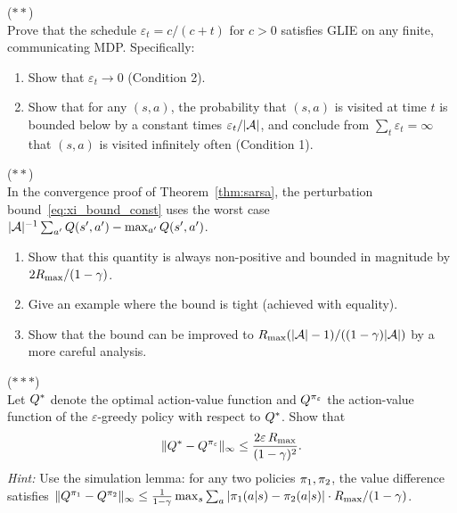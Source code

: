 \documentclass[11pt,a4paper]{article}
\begin{document}
\begin{exercise}
\textnormal{(\(**\))} \\
Prove that the schedule $\varepsilon_t = c/(c+t)$ for $c > 0$
satisfies GLIE on any finite, communicating MDP. Specifically:
\begin{enumerate}[nosep]
  \item[(a)] Show that $\varepsilon_t \to 0$ (Condition 2).
  \item[(b)] Show that for any $(s,a)$, the probability that
    $(s,a)$ is visited at time $t$ is bounded below by a constant
    times $\varepsilon_t/|\mathcal{A}|$, and conclude from
    $\sum_t \varepsilon_t = \infty$ that $(s,a)$ is visited
    infinitely often (Condition 1).
\end{enumerate}
\end{exercise}

\begin{exercise}
\textnormal{(\(**\))} \\
In the convergence proof of Theorem~\ref{thm:sarsa}, the
perturbation bound~\eqref{eq:xi_bound_const} uses the worst case
$|\mathcal{A}|^{-1}\sum_{a'} Q(s',a') - \max_{a'} Q(s',a')$.
\begin{enumerate}[nosep]
  \item[(a)] Show that this quantity is always non-positive and
    bounded in magnitude by $2R_{\max}/(1-\gamma)$.
  \item[(b)] Give an example where the bound is tight (achieved
    with equality).
  \item[(c)] Show that the bound can be improved to
    $R_{\max}(|\mathcal{A}|-1)/((1-\gamma)|\mathcal{A}|)$ by a
    more careful analysis.
\end{enumerate}
\end{exercise}

\begin{exercise}
\textnormal{(\(***\))} \\
Let $Q^*$ denote the optimal action-value function and
$Q^{\pi_\varepsilon}$ the action-value function of the
$\varepsilon$-greedy policy with respect to $Q^*$. Show that
\begin{equation*}
  \|Q^* - Q^{\pi_\varepsilon}\|_\infty
  \leq \frac{2\varepsilon\,R_{\max}}{(1-\gamma)^2}.
\end{equation*}
\textit{Hint:} Use the simulation lemma: for any two policies
$\pi_1, \pi_2$, the value difference satisfies
$\|Q^{\pi_1} - Q^{\pi_2}\|_\infty \leq
\frac{1}{1-\gamma} \max_s \sum_a |\pi_1(a|s)
- \pi_2(a|s)| \cdot R_{\max}/(1-\gamma)$.
\end{exercise}
\end{document}
